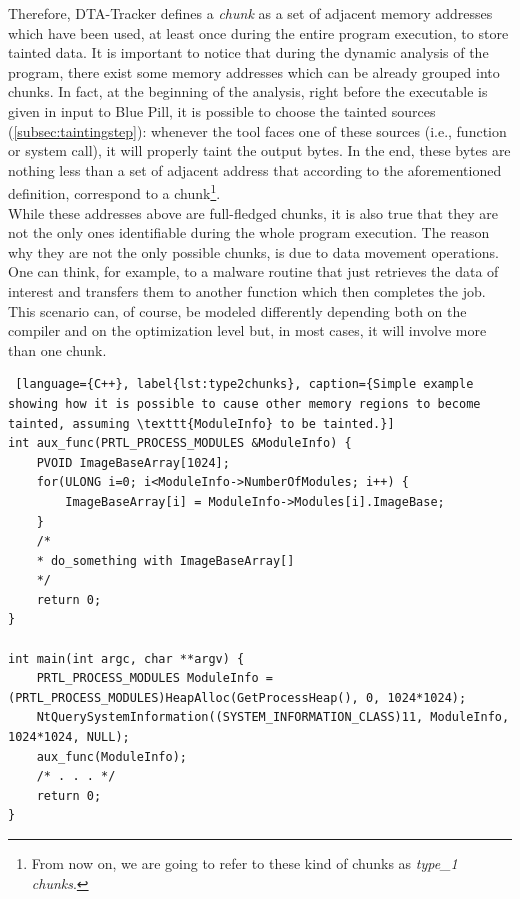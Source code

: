 \documentclass[LaM,binding=0.6cm]{sapthesis}
\begin{document}
Therefore, DTA-Tracker defines a \textit{chunk} as a set of adjacent memory addresses which have been used, at least once during the entire program execution, to store tainted data. It is important to notice that during the dynamic analysis of the program, there exist some memory addresses which can be already grouped into chunks. In fact, at the beginning of the analysis, right before the executable is given in input to Blue Pill, it is possible to choose the tainted sources (\autoref{subsec:taintingstep}): whenever the tool faces one of these sources (i.e., function or system call), it will properly taint the output bytes. In the end, these bytes are nothing less than a set of adjacent address that according to the aforementioned definition, correspond to a chunk\footnote{From now on, we are going to refer to these kind of chunks as \textit{type\_1 chunks}.}.\\
While these addresses above are full-fledged chunks, it is also true that they are not the only ones identifiable during the whole program execution. The reason why they are not the only possible chunks, is due to data movement operations. One can think, for example, to a malware routine that just retrieves the data of interest and transfers them to another function which then completes the job. This scenario can, of course, be modeled differently depending both on the compiler and on the optimization level but, in most cases, it will involve more than one chunk.
\newpage
\begin{lstlisting} [language={C++}, label{lst:type2chunks}, caption={Simple example showing how it is possible to cause other memory regions to become tainted, assuming \texttt{ModuleInfo} to be tainted.}]
int aux_func(PRTL_PROCESS_MODULES &ModuleInfo) {
	PVOID ImageBaseArray[1024];
	for(ULONG i=0; i<ModuleInfo->NumberOfModules; i++) {
		ImageBaseArray[i] = ModuleInfo->Modules[i].ImageBase;
	}
	/*
	* do_something with ImageBaseArray[]
	*/
	return 0;
}

int main(int argc, char **argv) {
	PRTL_PROCESS_MODULES ModuleInfo = (PRTL_PROCESS_MODULES)HeapAlloc(GetProcessHeap(), 0, 1024*1024);
	NtQuerySystemInformation((SYSTEM_INFORMATION_CLASS)11, ModuleInfo, 1024*1024, NULL);
	aux_func(ModuleInfo);
	/* . . . */
	return 0;
}

\end{lstlisting}
\end{document}
